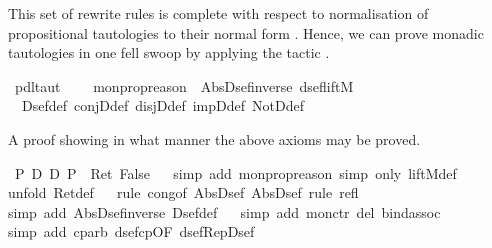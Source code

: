 \begin{isabellebody}
\begin{isamarkuptext}
  This set of rewrite rules is complete with respect to normalisation
  of propositional tautologies to their normal form 
  . Hence, we can prove monadic tautologies 
  in one fell swoop by applying 
  the tactic .%
\end{isamarkuptext}%
\isamarkuptrue%
\ pdl{\isacharunderscore}taut\ {\isacharequal}\ \ %
\isanewline
\isanewline
\isanewline
\isamarkupfalse%
\ mon{\isacharunderscore}prop{\isacharunderscore}reason\ {\isacharequal}\ Abs{\isacharunderscore}Dsef{\isacharunderscore}inverse\ dsef{\isacharunderscore}liftM{}\ \isanewline
\ \ Dsef{\isacharunderscore}def\ conjD{\isacharunderscore}def\ disjD{\isacharunderscore}def\ impD{\isacharunderscore}def\ NotD{\isacharunderscore}def\isamarkupfalse%
%
\begin{isamarkuptext}%
A proof showing in what manner the above axioms may be proved.%
\end{isamarkuptext}%
\isamarkuptrue%
\ {\isachardoublequote}{\isacharparenleft}P\ {\isasymand}\isactrlsub D\ {\isacharparenleft}{\isasymnot}\isactrlsub D\ P{\isacharparenright}{\isacharparenright}\ {\isacharequal}\ Ret\ False{\isachardoublequote}\isanewline
\ \ \isamarkupfalse%
simp\ add{\isacharcolon}\ mon{\isacharunderscore}prop{\isacharunderscore}reason{\isacharcomma}\ simp\ only{\isacharcolon}\ liftM{}{\isacharunderscore}def{\isacharparenright}\isanewline
\ \ \isamarkupfalse%
unfold\ Ret{\isacharunderscore}def{\isacharparenright}\isanewline
\ \ \isamarkupfalse%
rule\ cong{\isacharbrackleft}of\ Abs{\isacharunderscore}Dsef\ Abs{\isacharunderscore}Dsef{\isacharbrackright}{\isacharcomma}\ rule\ refl{\isacharparenright}\isanewline
\ \ \isamarkupfalse%
simp\ add{\isacharcolon}\ Abs{\isacharunderscore}Dsef{\isacharunderscore}inverse\ Dsef{\isacharunderscore}def{\isacharparenright}\isanewline
\ \ \isamarkupfalse%
simp\ add{\isacharcolon}\ mon{\isacharunderscore}ctr\ del{\isacharcolon}\ bind{\isacharunderscore}assoc{\isacharparenright}\isanewline
\ \ \isamarkupfalse%
simp\ add{\isacharcolon}\ cp{\isacharunderscore}arb\ dsef{\isacharunderscore}cp{\isacharbrackleft}OF\ dsef{\isacharunderscore}Rep{\isacharunderscore}Dsef{\isacharbrackright}{\isacharparenright}\isanewline

\end{isabellebody}
